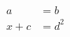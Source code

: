 \documentclass{article}
\begin{document}
\begin{equation*}
\begin{aligned}
    a &= b \\
x + c &= d^2
\end{aligned}
\end{equation*}
\end{document}

